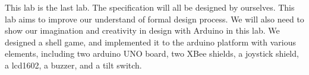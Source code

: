 This lab is the last lab. The specification will all be designed by ourselves. This lab aims to improve our understand of formal design process. We will also need to show our imagination and creativity in design with Arduino in this lab.
\newline
We designed a shell game, and implemented it to the arduino platform with various elements, including two arduino UNO board, two XBee shields, a joystick shield, a lcd1602, a buzzer, and a tilt switch.